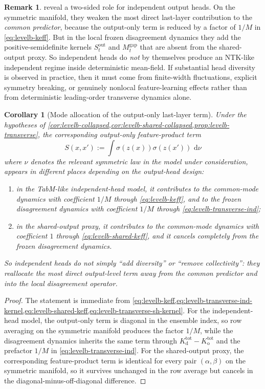 \documentclass[11pt]{article}
\newtheorem{corollary}[theorem]{Corollary}
\theoremstyle{definition}
\newtheorem{remark}[theorem]{Remark}
\newcommand{\dd}{\,\mathrm{d}}
\begin{document}
\begin{remark}
\label{rem:levelb-two-sided}
 reveal a two-sided role for independent output heads.
On the symmetric manifold, they weaken the most direct last-layer contribution to the \emph{common predictor}, because the output-only term is reduced by a factor of $1/M$ in \cref{eq:levelb-keff}.
But in the local frozen disagreement dynamics they add the positive-semidefinite kernels $S_t^{\mathrm{out}}$ and $M_t^{\mathrm{gap}}$ that are absent from the shared-output proxy.
So independent heads do \emph{not} by themselves produce an NTK-like independent regime inside deterministic mean-field.
If substantial head diversity is observed in practice, then it must come from finite-width fluctuations, explicit symmetry breaking, or genuinely nonlocal feature-learning effects rather than from deterministic leading-order transverse dynamics alone.
\end{remark}

\begin{corollary}[Mode allocation of the output-only last-layer term]
\label{cor:levelb-mode-allocation}
Under the hypotheses of \cref{cor:levelb-collapsed,cor:levelb-shared-collapsed,prop:levelb-transverse},
the corresponding output-only feature-product term
\[
  S(x,x')
  :=
  \int
  \sigma(z(x))\sigma(z(x'))
  \,\dd \nu
\]
where $\nu$ denotes the relevant symmetric law in the model under consideration,
appears in different places depending on the output-head design:
\begin{enumerate}[leftmargin=2em]
  \item in the TabM-like independent-head model, it contributes to the common-mode dynamics with coefficient $1/M$ through \cref{eq:levelb-keff}, and to the frozen disagreement dynamics with coefficient $1/M$ through \cref{eq:levelb-transverse-ind};
  \item in the shared-output proxy, it contributes to the common-mode dynamics with coefficient $1$ through \cref{eq:levelb-shared-keff}, and it cancels completely from the frozen disagreement dynamics.
\end{enumerate}
So independent heads do not simply ``add diversity'' or ``remove collectivity'':
they reallocate the most direct output-level term away from the common predictor and into the local disagreement operator.
\end{corollary}

\begin{proof}
The statement is immediate from \cref{eq:levelb-keff,eq:levelb-transverse-ind-kernel,eq:levelb-shared-keff,eq:levelb-transverse-sh-kernel}.
For the independent-head model, the output-only term is diagonal in the ensemble index, so row averaging on the symmetric manifold produces the factor $1/M$, while the disagreement dynamics inherits the same term through $K_{\mathrm d}^{\mathrm{tot}}-K_{\mathrm o}^{\mathrm{tot}}$ and the prefactor $1/M$ in \cref{eq:levelb-transverse-ind}.
For the shared-output proxy, the corresponding feature-product term is identical for every pair $(\alpha,\beta)$ on the symmetric manifold, so it survives unchanged in the row average but cancels in the diagonal-minus-off-diagonal difference.
\end{proof}
\end{document}
